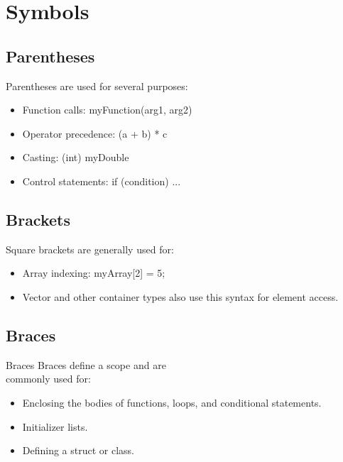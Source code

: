 \documentclass{report}
\begin{document}
    \section{\LARGE Symbols}
    \bigbreak \noindent 
    \begin{minipage}[t]{0.47\textwidth}
        \subsection{Parentheses}
        \bigbreak \noindent 
        Parentheses are used for several purposes:
        \begin{itemize}
            \item Function calls: myFunction(arg1, arg2)
            \item Operator precedence: (a + b) * c
            \item Casting: (int) myDouble
            \item Control statements: if (condition) { ... }
        \end{itemize}
    \end{minipage}
    \begin{minipage}[t]{0.47\textwidth}
    \subsection{Brackets}
    \bigbreak \noindent 
    Square brackets are generally used for:
    \begin{itemize}
        \item Array indexing: myArray[2] = 5;
        \item Vector and other container types also use this syntax for element access.
    \end{itemize}
    \end{minipage}
    \bigbreak \noindent \bigbreak \noindent 
    \begin{minipage}[t]{0.47\textwidth}
    \subsection{Braces}
    \bigbreak \noindent 
    Braces Braces define a scope and are \\ commonly used for:
    \begin{itemize}
        \item Enclosing the bodies of functions, loops, and conditional statements.
        \item Initializer lists.
        \item Defining a struct or class.
    \end{itemize}
    \end{minipage}
\end{document}
